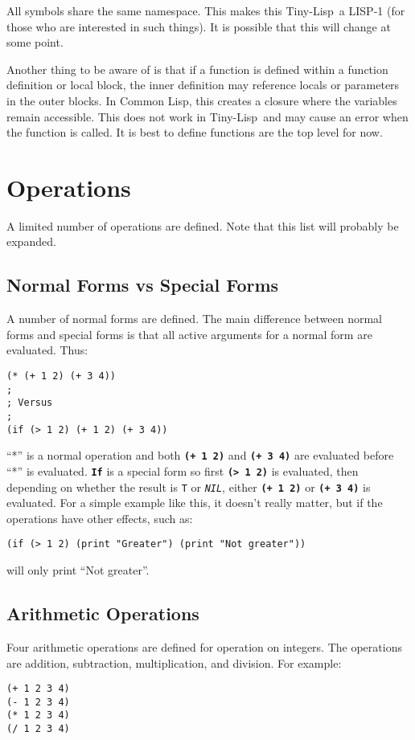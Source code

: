 \documentclass[10pt, openany]{book}
\newcommand{\operation}[1]{\textbf{\texttt{#1}}}
\newcommand{\function}[1]{\texttt{#1}}
\newcommand{\constant}[1]{\emph{\texttt{#1}}}
\newcommand{\tl}{Tiny-Lisp}
\newcommand{\cl}{Common Lisp}
\begin{document}
All symbols share the same namespace.  This makes this \tl\ a LISP-1 (for those who are interested in such things).  It is possible that this will change at some point.

Another thing to be aware of is that if a function is defined within a function definition or local block, the inner definition may reference locals or parameters in the outer blocks.  In \cl, this creates a closure where the variables remain accessible.  This does not work in \tl\ and may cause an error when the function is called.  It is best to define functions are the top level for now.

\section{Operations}
A limited number of operations are defined.  Note that this list will probably be expanded.

\subsection{Normal Forms vs Special Forms}
A number of normal forms are defined.  The main difference between normal forms and special forms is that all active arguments for a normal form are evaluated.  Thus:
\begin{lstlisting}
(* (+ 1 2) (+ 3 4))
;
; Versus
;
(if (> 1 2) (+ 1 2) (+ 3 4))
\end{lstlisting}
``*'' is a normal operation and both \operation{(+ 1 2)} and \operation{(+ 3 4)} are evaluated before ``*'' is evaluated.  \operation{If} is a special form so first \operation{(> 1 2)} is evaluated, then depending on whether the result is \function{T} or \constant{NIL}, either \operation{(+ 1 2)} or \operation{(+ 3 4)} is evaluated.  For a simple example like this, it doesn't really matter, but if the operations have other effects, such as:

\begin{lstlisting}
(if (> 1 2) (print "Greater") (print "Not greater"))
\end{lstlisting}

will only print ``Not greater''.

\subsection{Arithmetic Operations}
Four arithmetic operations are defined for operation on integers.  The operations are addition, subtraction, multiplication, and division.  For example:
\begin{lstlisting}
(+ 1 2 3 4)
(- 1 2 3 4)
(* 1 2 3 4)
(/ 1 2 3 4)
\end{lstlisting}
\end{document}
